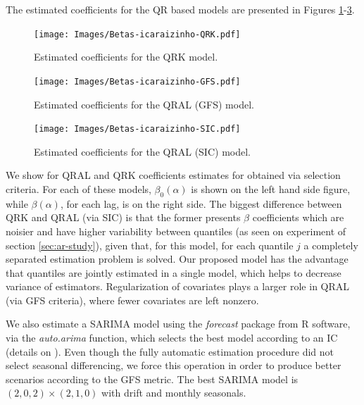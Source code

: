 The estimated coefficients for the QR based models are presented in Figures \ref{fig:betas-qrk}-\ref{fig:betas-sic}. 
\begin{figure}[ht]
	\centering
	\texttt{[image: Images/Betas-icaraizinho-QRK.pdf]}
	\caption{Estimated coefficients for the QRK model.}
	\label{fig:betas-qrk}
\end{figure}
\begin{figure}[ht]
	\centering
	\texttt{[image: Images/Betas-icaraizinho-GFS.pdf]}
	\caption{Estimated coefficients for the QRAL (GFS) model.}
	\label{fig:betas-gfs}
\end{figure}
\begin{figure}[ht]
	\centering
	\texttt{[image: Images/Betas-icaraizinho-SIC.pdf]}
	\caption{Estimated coefficients for the QRAL (SIC) model.}
	\label{fig:betas-sic}
\end{figure}
We show for QRAL and QRK coefficients estimates for obtained via selection criteria. For each of these models, $\beta_0(\alpha)$ is shown on the left hand side figure, while $\beta(\alpha)$, for each lag, is on the right side.
The biggest difference between QRK and QRAL (via SIC) is that the former presents $\beta$ coefficients which are noisier and have higher variability between quantiles (as seen on experiment of section \ref{sec:ar-study}), given that, for this model, for each quantile $j$ a completely separated estimation problem is solved. Our proposed model has the advantage that quantiles are jointly estimated in a single model, which helps to decrease variance of estimators. Regularization of covariates plays a larger role in QRAL (via GFS criteria), where fewer covariates are left nonzero.

We also estimate a SARIMA model using the \emph{forecast} \cite{hyndman2008forecastpackage} package from R software, via the \emph{auto.arima} function, which selects the best model according to an IC (details on \cite{hyndman2008forecastmanual}). Even though the fully automatic estimation procedure did not select seasonal differencing, we force this operation in order to produce better scenarios according to the GFS metric. The best SARIMA model is $(2,0,2)\times(2,1,0)$ with drift and monthly seasonals.


